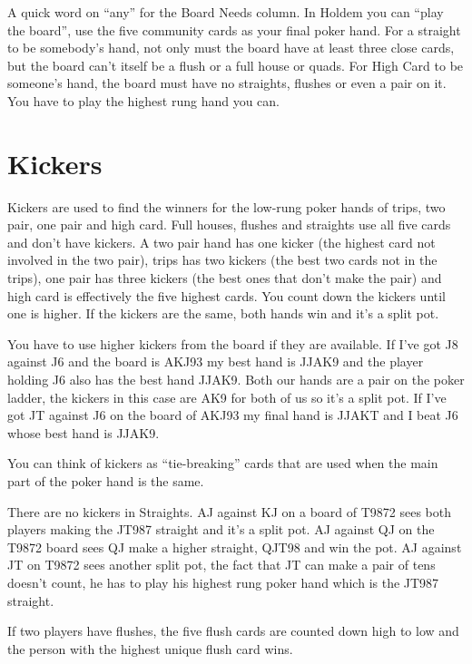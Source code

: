 A quick word on ``any'' for the Board Needs column. In
Holdem you can ``play the board'', use the five community cards as
your final poker hand. For a straight to be somebody's hand, not only
must the board have at least three close cards, but the board can't
itself be a flush or a full house or quads. For High Card to be
someone's hand, the board must have no straights, flushes or even a pair
on it. You have to play the highest rung hand you can.

\section{Kickers}

Kickers are used to find the winners for the low-rung poker hands of
trips, two pair, one pair and high card. Full houses, flushes and
straights use all five cards and don't have kickers. A two pair hand
has one kicker (the highest card not involved in the two pair), trips
has two kickers (the best two cards not in the trips), one pair has
three kickers (the best ones that don't make the pair) and high card
is effectively the five highest cards. You count down the kickers
until one is higher. If the kickers are the same, both hands win and
it's a split pot.

You have to use higher kickers from the board if they are available.
If I've got J8 against J6 and the board is AKJ93 my best hand is JJAK9
and the player holding J6 also has the best hand JJAK9. Both our hands
are a pair on the poker ladder, the kickers in this case are AK9 for
both of us so it's a split pot. If I've got JT against J6 on the board
of AKJ93 my final hand is JJAKT and I beat J6 whose best hand is
JJAK9.

You can think of kickers as ``tie-breaking'' cards that are used when
the main part of the poker hand is the same.

There are no kickers in Straights. AJ against KJ on a board of
T9872 sees both players making the JT987 straight and it's a split
pot. AJ against QJ on the T9872 board sees QJ make a higher
straight, QJT98 and win the pot. AJ against JT on T9872 sees another
split pot, the fact that JT can make a pair of tens doesn't count, he
has to play his highest rung poker hand which is the JT987 straight.

If two players have flushes, the five flush cards are counted down
high to low and the person with the highest unique flush card wins.


